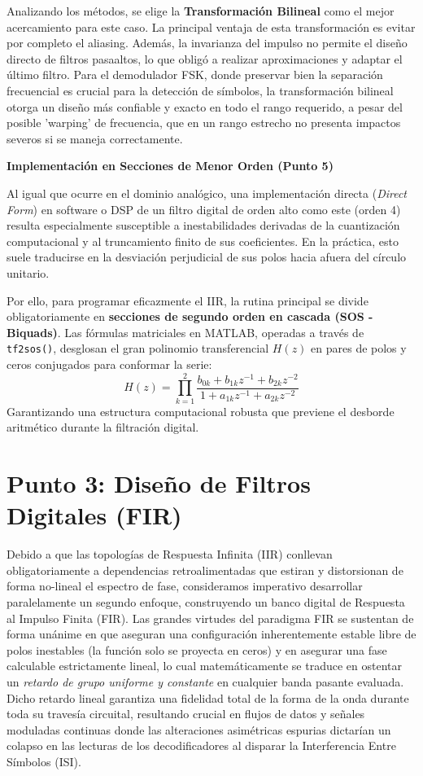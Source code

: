 \documentclass[9pt,a4paper,oneside]{rho-class/rho}
\begin{document}
    Analizando los métodos, se elige la \textbf{Transformación Bilineal} como el mejor acercamiento para este caso. La principal ventaja de esta transformación es evitar por completo el aliasing. Además, la invarianza del impulso no permite el diseño directo de filtros pasaaltos, lo que obligó a realizar aproximaciones y adaptar el último filtro. Para el demodulador FSK, donde preservar bien la separación frecuencial es crucial para la detección de símbolos, la transformación bilineal otorga un diseño más confiable y exacto en todo el rango requerido, a pesar del posible 'warping' de frecuencia, que en un rango estrecho no presenta impactos severos si se maneja correctamente.

    \textbf{Implementación en Secciones de Menor Orden (Punto 5)}
    
    Al igual que ocurre en el dominio analógico, una implementación directa (\textit{Direct Form}) en software o DSP de un filtro digital de orden alto como este (orden 4) resulta especialmente susceptible a inestabilidades derivadas de la cuantización computacional y al truncamiento finito de sus coeficientes. En la práctica, esto suele traducirse en la desviación perjudicial de sus polos hacia afuera del círculo unitario. 
    
    Por ello, para programar eficazmente el IIR, la rutina principal se divide obligatoriamente en \textbf{secciones de segundo orden en cascada (SOS - Biquads)}. Las fórmulas matriciales en MATLAB, operadas a través de \texttt{tf2sos()}, desglosan el gran polinomio transferencial $H(z)$ en pares de polos y ceros conjugados para conformar la serie:
    \begin{equation}
        H(z) = \prod_{k=1}^{2} \frac{b_{0k} + b_{1k} z^{-1} + b_{2k} z^{-2}}{1 + a_{1k} z^{-1} + a_{2k} z^{-2}}
    \end{equation}
    Garantizando una estructura computacional robusta que previene el desborde aritmético durante la filtración digital.

\section{Punto 3: Diseño de Filtros Digitales (FIR)}

    Debido a que las topologías de Respuesta Infinita (IIR) conllevan obligatoriamente a dependencias retroalimentadas que estiran y distorsionan de forma no-lineal el espectro de fase, consideramos imperativo desarrollar paralelamente un segundo enfoque, construyendo un banco digital de Respuesta al Impulso Finita (FIR). Las grandes virtudes del paradigma FIR se sustentan de forma unánime en que aseguran una configuración inherentemente estable libre de polos inestables (la función solo se proyecta en ceros) y en asegurar una fase calculable estrictamente lineal, lo cual matemáticamente se traduce en ostentar un \textit{retardo de grupo uniforme y constante} en cualquier banda pasante evaluada. Dicho retardo lineal garantiza una fidelidad total de la forma de la onda durante toda su travesía circuital, resultando crucial en flujos de datos y señales moduladas continuas donde las alteraciones asimétricas espurias dictarían un colapso en las lecturas de los decodificadores al disparar la Interferencia Entre Símbolos (ISI).
\end{document}
